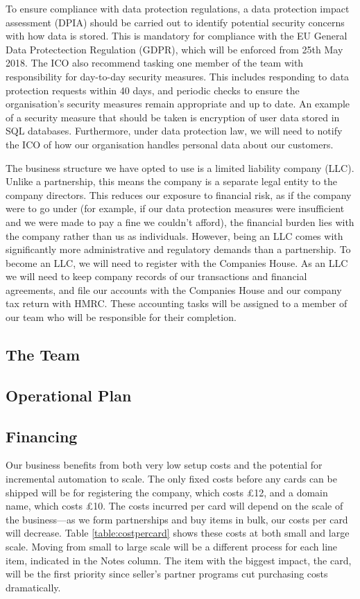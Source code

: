 \documentclass[10pt,a4paper]{article}
\begin{document}
To ensure compliance with data protection regulations, a data protection impact assessment (DPIA) should be carried out to identify potential security concerns with how data is stored. This is mandatory for compliance with the EU General Data Protectection Regulation (GDPR), which will be enforced from 25th May 2018. The ICO also recommend tasking one member of the team with responsibility for day-to-day security measures. This includes responding to data protection requests within 40 days, and periodic checks to ensure the organisation's security measures remain appropriate and up to date. An example of a security measure that should be taken is encryption of user data stored in SQL databases. Furthermore, under data protection law, we will need to notify the ICO of how our organisation handles personal data about our customers.

The business structure we have opted to use is a limited liability company (LLC). Unlike a partnership, this means the company is a separate legal entity to the company directors. This reduces our exposure to financial risk, as if the company were to go under (for example, if our data protection measures were insufficient and we were made to pay a fine we couldn't afford), the financial burden lies with the company rather than us as individuals. However, being an LLC comes with significantly more administrative and regulatory demands than a partnership. To become an LLC, we will need to register with the Companies House. As an LLC we will need to keep company records of our transactions and financial agreements, and file our accounts with the Companies House and our company tax return with HMRC. These accounting tasks will be assigned to a member of our team who will be responsible for their completion.

\subsection*{The Team}

\subsection*{Operational Plan}

\subsection*{Financing}

Our business benefits from both very low setup costs and the potential for incremental automation to scale. The only fixed costs before any cards can be shipped will be for registering the company, which costs £12, and a domain name, which costs £10. The costs incurred per card will depend on the scale of the business---as we form partnerships and buy items in bulk, our costs per card will decrease. Table \ref{table:costpercard} shows these costs at both small and large scale. Moving from small to large scale will be a different process for each line item, indicated in the Notes column. The item with the biggest impact, the card, will be the first priority since seller's partner programs cut purchasing costs dramatically.
\end{document}
